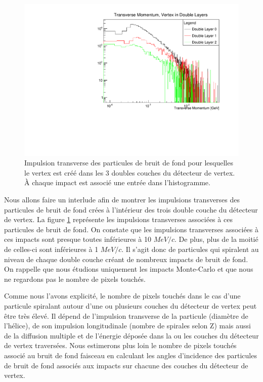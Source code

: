   \begin{figure}[!htb]
    \begin{center}
      \includegraphics[scale=0.60]{./figures/Beamstrahlung/Transverse_Momentum_Vertex_In_Layers.pdf}
      \caption{Impulsion transverse des particules de bruit de fond pour lesquelles le vertex est cr\'eé dans les 3 doubles couches du d\'etecteur de vertex. \`A chaque impact est associ\'e une entr\'ee dans l'histogramme.}
      \label{fig:pT_Vertex_In_Layers}
    \end{center}
  \end{figure}
  
  \medskip

  Nous allons faire un interlude afin de montrer les impulsions transverses des particules de bruit de fond cr\'ees \`a l'int\'erieur des trois double couche du d\'etecteur de vertex. La figure \ref{fig:pT_Vertex_In_Layers} repr\'esente les impulsions transverses associ\'ees \`a ces particules de bruit de fond. On constate que les impulsions transverses associ\'ees \`a ces impacts sont presque toutes inf\'erieures \`a 10 $MeV/c$. De plus, plus de la moiti\'e de celles-ci sont inf\'erieures \`a 1 $MeV/c$. Il s'agit donc de particules qui spiralent au niveau de chaque double couche cr\'eant de nombreux impacts de bruit de fond. On rappelle que nous \'etudions uniquement les impacts Monte-Carlo et que nous ne regardons pas le nombre de pixels touch\'es.
  
  \medskip
  
  Comme nous l'avons explicit\'e, le nombre de pixels touch\'es dans le cas d'une particule spiralant autour d'une ou plusieurs couches du d\'etecteur de vertex peut \^etre tr\`es \'elev\'e. Il d\'epend de l'impulsion transverse de la particule (diamètre de l'h\'elice), de son impulsion longitudinale (nombre de spirales selon Z) mais aussi de la diffusion multiple et de l'\'energie d\'epos\'ee dans la ou les couches du d\'etecteur de vertex travers\'ees. Nous estimerons plus loin le nombre de pixels touch\'es associ\'e au bruit de fond faisceau en calculant les angles d'incidence des particules de bruit de fond associ\'es aux impacts sur chacune des couches du d\'etecteur de vertex.
  
